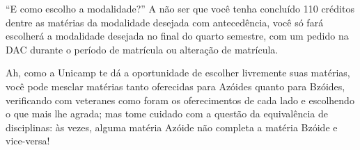 “E como escolho a modalidade?” A não ser que você tenha concluído 110 créditos  dentre as matérias da modalidade desejada com antecedência, você só fará escolherá a  modalidade desejada no final do quarto semestre, com um pedido na DAC durante o  período de matrícula ou alteração de matrícula. 

Ah, como a Unicamp te dá a oportunidade de escolher livremente suas matérias, você pode mesclar matérias tanto oferecidas para Azóides quanto para Bzóides, verificando  com veteranes como foram os oferecimentos de cada lado e escolhendo o que mais lhe  agrada; mas tome cuidado com a questão da equivalência de disciplinas: às vezes,  alguma matéria Azóide não completa a matéria Bzóide e vice-versa! 
